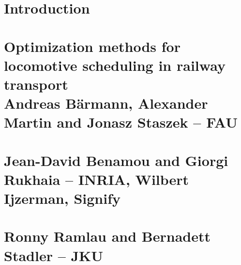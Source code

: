 \documentclass{ROMSOC}
\begin{document}
\newpage
%

\lofoot[\footerlogo \hspace{10pt} \footertext]{\footerlogo \hspace{10pt} \footertext}
\lefoot[\footerlogo \hspace{10pt} \footertext]{\footerlogo \hspace{10pt} \footertext}

\rofoot[\pagemark]{\pagemark}

\rohead{\rightmark}
\rehead{\rightmark}

\newpage
\setcounter{page}{1}
\pagestyle{scrheadings}

\part{Introduction}


\newpage
\part[Optimization methods for locomotive scheduling in railway transport~\newline(Andreas Bärmann, Alexander Martin and Jonasz Staszek -- FAU)]{Optimization methods for locomotive scheduling in railway transport\\[0.25\baselineskip]\normalsize Andreas Bärmann, Alexander Martin and Jonasz Staszek -- FAU}


\newpage
\part[~(Jean-David Benamou and Giorgi Rukhaia -- INRIA, Wilbert Ijzerman -- Signify)]{\normalsize Jean-David Benamou and Giorgi Rukhaia -- INRIA, Wilbert Ijzerman, Signify}


\clearpage
\part[~(Ronny Ramlau and Bernadett Stadler -- JKU)]{\normalsize Ronny Ramlau and Bernadett Stadler -- JKU}


%
%
\newpage
\end{document}
